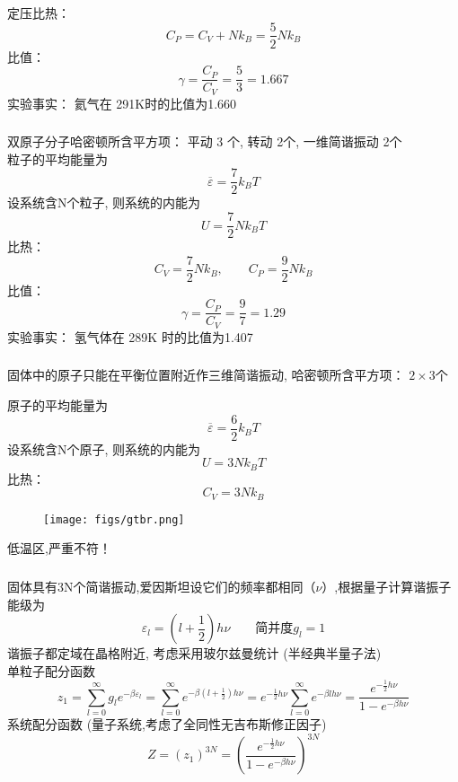 \begin{frame}
  \frametitle{}
  定压比热：
  \[ C_P = C_V + N k_B = \frac{5}{2} N k_B\] 
  比值： 
  \[\gamma = \frac{C_P}{C_V} = \frac{5}{3} = 1.667 \]
  实验事实： 氦气在 291K时的比值为1.660
\end{frame} 

\begin{frame}
  \frametitle{}
  \解 双原子分子哈密顿所含平方项： 平动 3 个, 转动 2个, 一维简谐振动 2个\\
  粒子的平均能量为
  \[ \overline{\varepsilon }  = \frac{7}{2}k_BT\]
  设系统含N个粒子, 则系统的内能为
  \[ U= \frac{7}{2} N k_BT\]
  比热： 
  \[ C_V = \frac{7}{2} N k_B, \qquad C_P = \frac{9}{2} N k_B\]  
  比值： 
  \[\gamma = \frac{C_P}{C_V} = \frac{9}{7} = 1.29 \]
  实验事实： 氢气体在 289K 时的比值为1.407
\end{frame} 

\begin{frame}
  \frametitle{}
  \解 固体中的原子只能在平衡位置附近作三维简谐振动, 哈密顿所含平方项： $2\times 3$个\\
  \begin{minipage}[b]{0.49\textwidth}
    原子的平均能量为
    \[ \overline{\varepsilon }  = \frac{6}{2}k_BT\]
    设系统含N个原子, 则系统的内能为
    \[ U= 3 N k_BT\]
    比热： 
    \[ C_V = 3 N k_B\] 
    \end{minipage} 
  \begin{minipage}[b]{0.49\textwidth}
    \begin{figure}[htbp]
      \centering
      \texttt{[image: figs/gtbr.png]}
     \end{figure}
    \end{minipage}
    低温区,严重不符！
\end{frame} 

\begin{frame}
  \frametitle{}
  \解 固体具有3N个简谐振动,爱因斯坦设它们的频率都相同（$\nu$）,根据量子计算谐振子能级为
  \[\varepsilon _l = (l+ \frac{1}{2}) h \nu \qquad \text{简并度} g_l =1\]
  谐振子都定域在晶格附近, 考虑采用玻尔兹曼统计 (半经典半量子法) \\
  单粒子配分函数
  \[ z_1 = \sum_{l=0}^\infty g_l e^{-\beta \varepsilon_l} = \sum_{l=0}^\infty e^{-\beta (l+ \frac{1}{2}) h \nu} = e^{-\frac{1}{2}h \nu} \sum_{l=0}^\infty e^{-\beta l h \nu} = \frac{e^{-\frac{1}{2}h \nu}}{1- e^{-\beta h \nu}}\]
  系统配分函数 (量子系统,考虑了全同性无吉布斯修正因子)
  \[ Z = (z_1)^{3N} = \left(\frac{e^{-\frac{1}{2}h \nu}}{1- e^{-\beta h \nu}}\right)^{3N}\]
\end{frame} 

